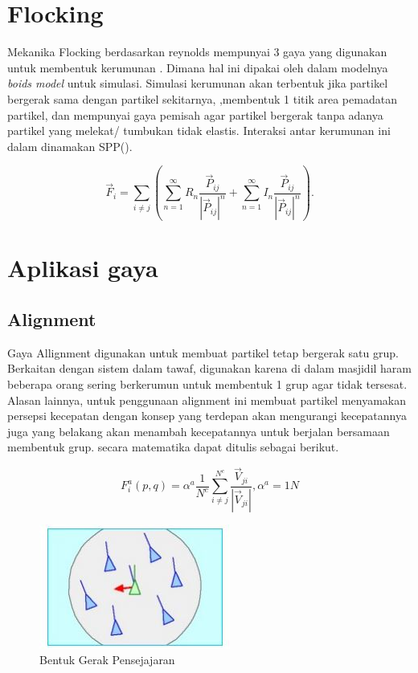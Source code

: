 \section{Flocking}\label{sec:flocking}

Mekanika Flocking berdasarkan reynolds mempunyai 3 gaya yang digunakan untuk membentuk kerumunan   \citep{Reynolds1987} \citep{Nasir2016}. Dimana hal ini dipakai oleh \citep{Chate2008} dalam modelnya \emph{boids model} untuk simulasi. Simulasi kerumunan akan terbentuk jika partikel bergerak sama dengan partikel sekitarnya, ,membentuk 1 titik area pemadatan partikel, dan mempunyai gaya pemisah agar partikel bergerak tanpa adanya partikel yang melekat/ tumbukan tidak elastis. Interaksi antar kerumunan ini dalam \citep{Chate2008} dinamakan SPP(). 

\begin{equation}
\vec{F}_i = \sum_{i \neq j} (\sum_{n=1}^{\infty} R_{n} \dfrac{\vec{P}_{ij}}{|\vec{P}_{ij}|^n}  + \sum_{n=1}^{\infty} I_{n} \dfrac{\vec{P}_{ij}}{|\vec{P}_{ij}|^n}). 
\end{equation}

\section{Aplikasi gaya}\label{cha:aplikasi gaya}

\subsection{Alignment}\label{sec:alignment}
\hspace {0.5cm} Gaya Allignment digunakan untuk membuat partikel tetap bergerak satu grup. Berkaitan dengan sistem dalam tawaf, digunakan karena di dalam masjidil haram beberapa orang sering berkerumun untuk membentuk 1 grup agar tidak tersesat. Alasan lainnya, untuk penggunaan alignment ini membuat partikel menyamakan persepsi kecepatan dengan konsep yang terdepan akan mengurangi kecepatannya juga yang belakang akan menambah kecepatannya untuk berjalan bersamaan membentuk grup. secara matematika dapat ditulis sebagai berikut.

\begin{equation}
 F_i^a(p,q) = \alpha^a \dfrac{1}{N^c}\sum^{N^c}_{i \neq j}\dfrac{\vec{V}_{ji}}{|\vec{V}_{ji}|},\alpha^a = 1N
\end{equation}


\begin{figure}
\centering
\includegraphics[scale=0.5]{gambar/allignment}
\caption{Bentuk Gerak Pensejajaran}
\end{figure}

